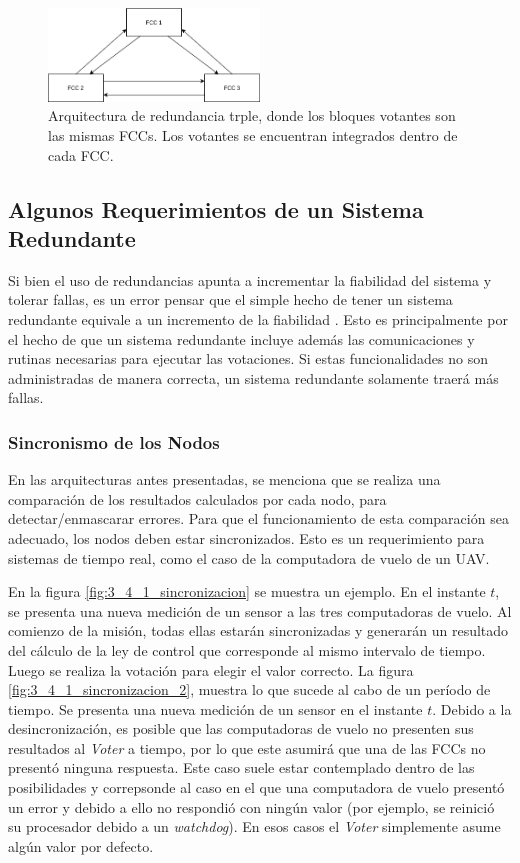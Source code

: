 \begin{figure}[H]
    \centering
    \includegraphics[width=0.5\textwidth]{img/3_5_TMR_2.png}
    \caption{Arquitectura de redundancia trple, donde los bloques votantes son las mismas FCCs. Los votantes se encuentran integrados dentro de cada FCC.}
    \label{fig:3_5_TMR_2}
\end{figure}

\subsection{Algunos Requerimientos de un Sistema Redundante}

Si bien el uso de redundancias apunta a incrementar la fiabilidad del sistema y tolerar fallas, es un error pensar que el simple hecho de tener un sistema redundante equivale a un incremento de la fiabilidad \cite{lala1994architectural}. Esto es principalmente por el hecho de que un sistema redundante incluye además las comunicaciones y rutinas necesarias para ejecutar las votaciones. Si estas funcionalidades no son administradas de manera correcta, un sistema redundante solamente traerá más fallas.

\subsubsection{Sincronismo de los Nodos}\label{sec:sincronismo_TMR}

En las arquitecturas antes presentadas, se menciona que se realiza una comparación de los resultados calculados por cada nodo, para detectar/enmascarar errores. Para que el funcionamiento de esta comparación sea adecuado, los nodos deben estar sincronizados. Esto es un requerimiento para sistemas de tiempo real, como el caso de la computadora de vuelo de un UAV.

En la figura \ref{fig:3_4_1_sincronizacion} se muestra un ejemplo. En el instante $t$, se presenta una nueva medición de un sensor a las tres computadoras de vuelo. Al comienzo de la misión, todas ellas estarán sincronizadas y generarán un resultado del cálculo de la ley de control que corresponde al mismo intervalo de tiempo. Luego se realiza la votación para elegir el valor correcto. La figura \ref{fig:3_4_1_sincronizacion_2}, muestra lo que sucede al cabo de un período de tiempo. Se presenta una nueva medición de un sensor en el instante $t$. Debido a la desincronización, es posible que las computadoras de vuelo no presenten sus resultados al \textit{Voter} a tiempo, por lo que este asumirá que una de las FCCs no presentó ninguna respuesta. Este caso suele estar contemplado dentro de las posibilidades y correpsonde al caso en el que una computadora de vuelo presentó un error y debido a ello no respondió con ningún valor (por ejemplo, se reinició su procesador debido a un \textit{watchdog}). En esos casos el \textit{Voter} simplemente asume algún valor por defecto.

